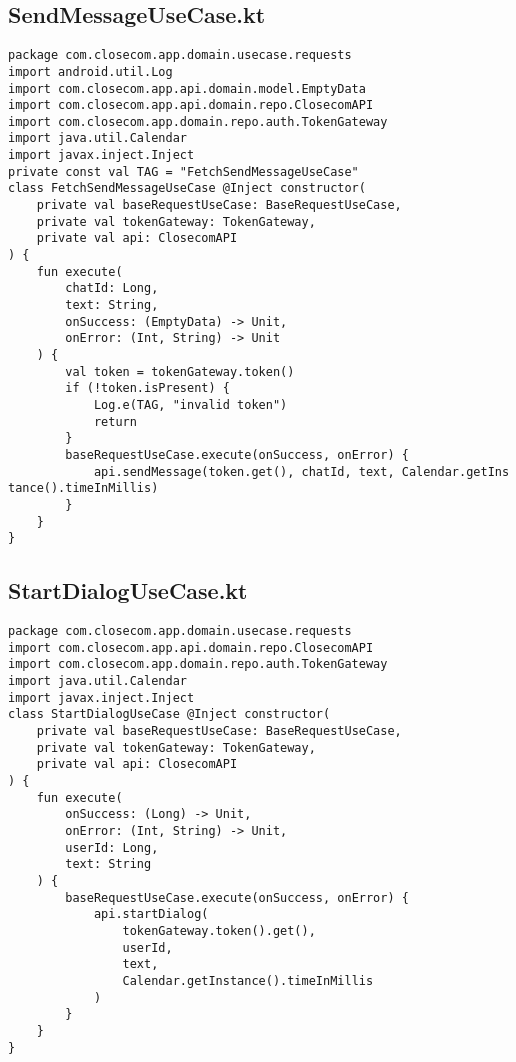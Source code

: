 \documentclass[listing]{espd}
\begin{document}
\subsection{SendMessageUseCase.kt}
\begin{verbatim}
package com.closecom.app.domain.usecase.requests
import android.util.Log
import com.closecom.app.api.domain.model.EmptyData
import com.closecom.app.api.domain.repo.ClosecomAPI
import com.closecom.app.domain.repo.auth.TokenGateway
import java.util.Calendar
import javax.inject.Inject
private const val TAG = "FetchSendMessageUseCase"
class FetchSendMessageUseCase @Inject constructor(
    private val baseRequestUseCase: BaseRequestUseCase,
    private val tokenGateway: TokenGateway,
    private val api: ClosecomAPI
) {
    fun execute(
        chatId: Long,
        text: String,
        onSuccess: (EmptyData) -> Unit,
        onError: (Int, String) -> Unit
    ) {
        val token = tokenGateway.token()
        if (!token.isPresent) {
            Log.e(TAG, "invalid token")
            return
        }
        baseRequestUseCase.execute(onSuccess, onError) {
            api.sendMessage(token.get(), chatId, text, Calendar.getIns
tance().timeInMillis)
        }
    }
}
\end{verbatim}

\subsection{StartDialogUseCase.kt}
\begin{verbatim}
package com.closecom.app.domain.usecase.requests
import com.closecom.app.api.domain.repo.ClosecomAPI
import com.closecom.app.domain.repo.auth.TokenGateway
import java.util.Calendar
import javax.inject.Inject
class StartDialogUseCase @Inject constructor(
    private val baseRequestUseCase: BaseRequestUseCase,
    private val tokenGateway: TokenGateway,
    private val api: ClosecomAPI
) {
    fun execute(
        onSuccess: (Long) -> Unit,
        onError: (Int, String) -> Unit,
        userId: Long,
        text: String
    ) {
        baseRequestUseCase.execute(onSuccess, onError) {
            api.startDialog(
                tokenGateway.token().get(),
                userId,
                text,
                Calendar.getInstance().timeInMillis
            )
        }
    }
}
\end{verbatim}
\end{document}
